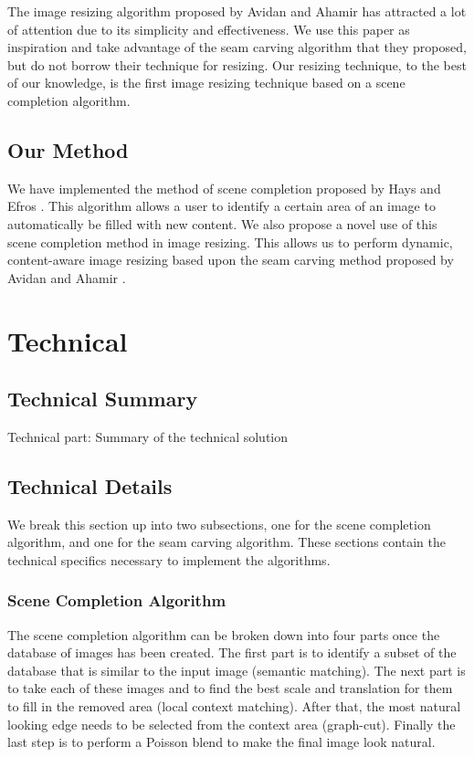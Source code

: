 \documentclass[11pt]{amsart}
\begin{document}
The image resizing algorithm proposed by Avidan and Ahamir has attracted a lot of attention due
to its simplicity and effectiveness. We use this paper as inspiration and take advantage of the seam carving algorithm that they proposed, but do not borrow their technique for resizing. Our resizing technique, to the best of our knowledge, is the first image resizing technique based on a scene
completion algorithm.

\subsection{Our Method}

We have implemented the method of scene completion proposed by Hays and Efros \cite{Hays:2007}. This algorithm allows a user to identify a certain area of an image to automatically be filled with new content. We also propose a novel use of this scene completion method in image resizing. This allows us to perform dynamic, content-aware image resizing based upon the seam carving method proposed by Avidan and Ahamir \cite{Avidan:2007}.

\section{Technical}

\subsection{Technical Summary}
Technical part: Summary of the technical solution 

\subsection{Technical Details}

We break this section up into two subsections, one for the scene completion algorithm, and one
for the seam carving algorithm. These sections contain the technical specifics necessary to implement 
the algorithms.

\subsubsection{Scene Completion Algorithm}

The scene completion algorithm can be broken down into four parts once the database of images has been created. The first part is to identify a subset of the database that is similar to the input image (semantic matching). The next part is to take each of these images and to find the best scale and translation for them to fill in the removed area (local context matching). After that, the most natural looking edge needs to be selected from the context area (graph-cut). Finally the last step is to perform a Poisson blend to make the final image look natural.
\end{document}
